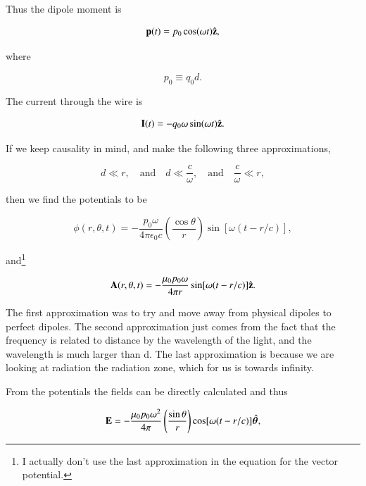 \documentclass[preprint, review,12pt]{elsarticle}
\def\b{\textbf}
\def\={\equiv}
\def\and{\quad \text{and} \quad}
\def\9{\left(}
\def\0{\right)}
\newcommand{\hb}[1]{\hat{\b #1}}
\newcommand{\hbm}[1]{\hat{\bm #1}}
\begin{document}
Thus the dipole moment is 

\begin{equation}
    \b p(t) = p_0 \cos(\omega t) \hb{z},
\end{equation}

where 

\begin{equation}
    p_0 \= q_0d.
\end{equation}

The current through the wire is

\begin{equation}
    \b I(t) = -q_0 \omega \sin(\omega t) \hb{z}.
\end{equation}

If we keep causality in mind, and make the following three approximations, 

\begin{equation}
    d \ll r, \and d \ll \frac{c}{\omega}, \and \frac{c}{\omega} \ll r,
\end{equation}

then we find the potentials to be

\begin{equation}
    \phi(r, \theta, t) = -\frac{p_0 \omega}{4 \pi \epsilon_0 c} \9 \frac{\cos \theta}{r} \0 \sin[\omega(t-r/c)],
\end{equation}

and\footnote{I actually don't use the last approximation in the equation for the vector potential.}

\begin{equation}
    \b A(r, \theta, t) = -\frac{\mu_0 p_0 \omega}{4 \pi r} \sin[\omega(t-r/c)] \hb{z}.
\end{equation}

The first approximation was to try and move away from physical dipoles to perfect dipoles. The second approximation just comes from the fact that the frequency is related to distance by the wavelength of the light, and the wavelength is much larger than d. The last approximation is because we are looking at radiation the radiation zone, which for us is towards infinity.

From the potentials the fields can be directly calculated and thus

\begin{equation}
    \b E = - \frac{\mu_0 p_0 \omega^2}{4 \pi} \9 \frac{\sin\theta}{r} \0 \cos[\omega(t-r/c)] \hbm{\theta},
\end{equation}
\end{document}
